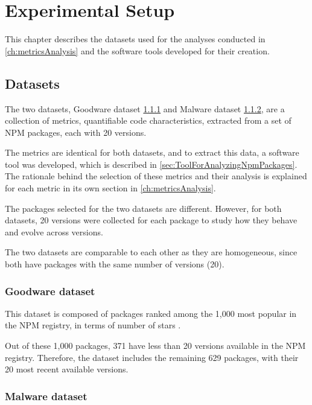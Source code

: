 \chapter{Experimental Setup}
\label{ch:ExperimentalSetup}

This chapter describes the datasets used for the analyses conducted in \cref{ch:metricsAnalysis}
and the software tools developed for their creation.

\section{Datasets}

The two datasets, Goodware dataset \cref{sec:goodwareDataset} and Malware dataset \cref{sec:malwareDataset},
are a collection of metrics, quantifiable code characteristics, extracted from 
a set of \ac{NPM} packages, each with 20 versions.

The metrics are identical for both datasets, and
to extract this data, a software tool was developed, 
which is described in \cref{sec:ToolForAnalyzingNpmPackages}.
The rationale behind the selection of these metrics and their analysis
is explained for each metric in its own section in \cref{ch:metricsAnalysis}.

The packages selected for the two datasets are different.
However, for both datasets, 20 versions were collected for each package
to study how they behave and evolve across versions.

The two datasets are comparable to each other 
as they are homogeneous, since both have packages with the same number of versions (20).

\subsection{Goodware dataset}
\label{sec:goodwareDataset}


This dataset is composed of packages ranked among the 1,000 most popular 
in the \ac{NPM} registry, in terms of number of stars \cite{tristan2026listtop10000npmpackages}.

Out of these 1,000 packages, 371 have less than 20 versions 
available in the \ac{NPM} registry.
Therefore, the dataset includes the 
remaining 629 packages, with their 20 most recent available versions.

\subsection{Malware dataset}
\label{sec:malwareDataset}


